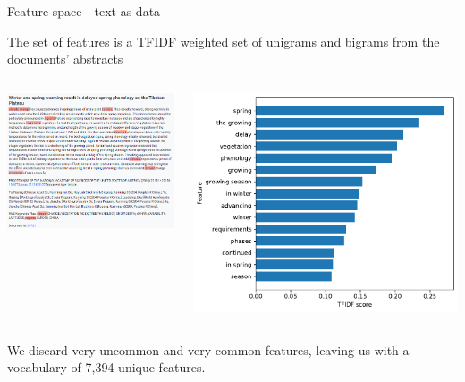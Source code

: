 \documentclass[9pt]{beamer}
\begin{document}
\begin{frame}{Feature space - text as data}

The set of features is a TFIDF weighted set of unigrams and bigrams from the documents' abstracts

\medskip

\begin{columns}
	\begin{column}{0.5\linewidth}
		\includegraphics[width=\linewidth]{images/doc_example.png}
	\end{column}
	\begin{column}{0.5\linewidth}
		\includegraphics[width=\linewidth]{images/example_doc_tfidf.pdf}
	\end{column}
\end{columns}

\medskip

We discard very uncommon and very common features, leaving us with a vocabulary of 7,394 unique features.

\end{frame}
\end{document}

